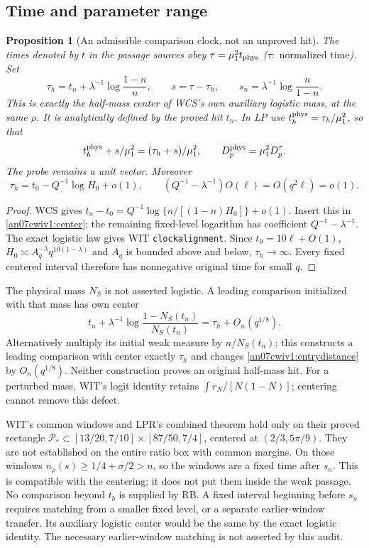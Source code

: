 \documentclass[11pt]{article}
\numberwithin{equation}{section}
\newtheorem{proposition}[theorem]{Proposition}
\theoremstyle{remark}\newtheorem{remark}[theorem]{Remark}
\begin{document}
\subsection{Time and parameter range}
\begin{proposition}[An admissible comparison clock, not an unproved hit]
\label{an07cwiv1:time}
The times denoted by \(t\) in the passage sources obey
\(\tau=\mu_1^2 t_{\rm phys}\) (\(\tau:\text{ normalized time}\)). Set
\begin{equation}
 \tau_h=t_n+\lambda^{-1}\log\frac{1-n}{n},\qquad
 s=\tau-\tau_h,\qquad s_n=\lambda^{-1}\log\frac n{1-n}.
 \label{an07cwiv1:center}
\end{equation}
This is exactly the half-mass center of WCS's own auxiliary logistic
mass, at the same \(\rho\). It is analytically defined by the proved
hit \(t_n\). In LP use \(t_h^{\rm phys}=\tau_h/\mu_1^2\), so that
\[
 t_h^{\rm phys}+s/\mu_1^2=(\tau_h+s)/\mu_1^2,\qquad
 D_p^{\rm phys}=\mu_1^2D_p^\tau .
 \]
The probe remains a unit vector. Moreover
\begin{equation}
 \tau_h=t_0-Q^{-1}\log H_0+o(1),\qquad
 (Q^{-1}-\lambda^{-1})O(\ell)=O(q^2\ell)=o(1).
 \label{an07cwiv1:Qtime}
\end{equation}
\end{proposition}
\begin{proof}
WCS gives \(t_n-t_0=Q^{-1}\log\{n/[(1-n)H_0]\}+o(1)\).
Insert this in \eqref{an07cwiv1:center}; the remaining fixed-level
logarithm has coefficient \(Q^{-1}-\lambda^{-1}\). The exact
logistic law gives WIT \texttt{clockalignment}. Since
\(t_0=10\ell+O(1)\), \(H_0\asymp A_q^{-\lambda}q^{10(1-\lambda)}\)
and \(A_q\) is bounded above and below, \(\tau_h\to\infty\).
Every fixed centered interval therefore has nonnegative original
time for small \(q\).
\end{proof}
The physical mass \(N_S\) is not asserted logistic. A leading
comparison initialized with that mass has own center
\[
 t_n+\lambda^{-1}\log\frac{1-N_S(t_n)}{N_S(t_n)}
       =\tau_h+O_n(q^{1/8}).
 \]
Alternatively multiply its initial weak measure by \(n/N_S(t_n)\);
this constructs a leading comparison with center exactly \(\tau_h\)
and changes \eqref{an07cwiv1:entrydistance} by \(O_n(q^{1/8})\).
Neither construction proves an original half-mass hit.
For a perturbed mass, WIT's logit identity retains
\(\int r_N/[N(1-N)]\); centering cannot remove this defect.

WIT's common windows and LPR's combined theorem hold only on their
proved rectangle
\(\mathcal P_*\subset[13/20,7/10]\times[87/50,7/4]\), centered at
\((2/3,5\pi/9)\). They are not established on the entire ratio box
with common margins. On those windows
\(n_\rho(s)\ge1/4+\sigma/2>n\), so the windows are a fixed time
after \(s_n\). This is compatible with the centering; it does not
put them inside the weak passage. No comparison beyond \(t_b\)
is supplied by RB. A fixed interval beginning before \(s_n\)
requires matching from a smaller fixed level, or a separate
earlier-window transfer. Its auxiliary logistic center would
be the same by the exact logistic identity. The necessary
earlier-window matching is not asserted by this audit.
\end{document}
